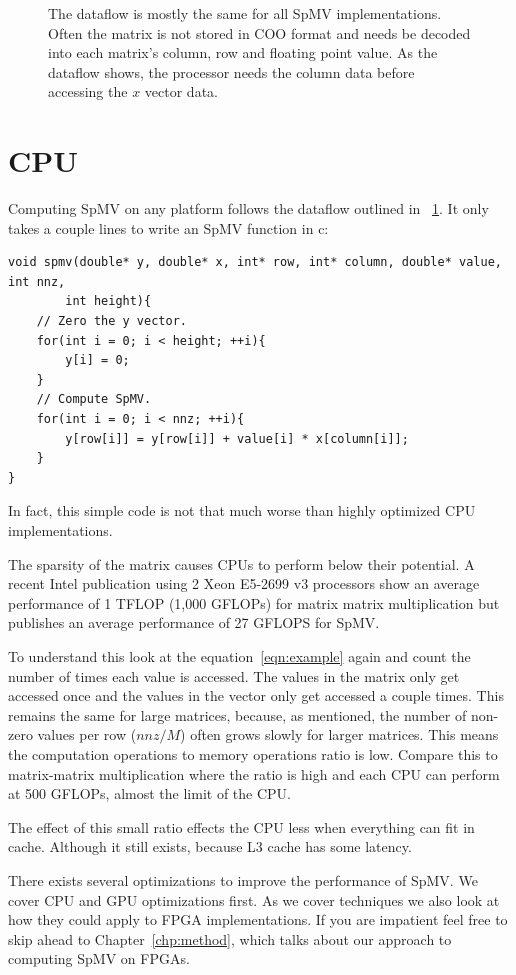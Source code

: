 \begin{figure}
\caption[SpMV dataflow diagram]{The dataflow is mostly the same for all SpMV implementations. Often the matrix is not stored in COO format and needs be decoded into each matrix's column, row and floating point value. As the dataflow shows, the processor needs the column data before accessing the $x$ vector data.}
\label{fig:dataflow}
\end{figure}%
\section{CPU}
Computing SpMV on any platform follows the dataflow outlined in \figurename~\ref{fig:dataflow}. It only takes a couple lines to write an SpMV function in c:
\begin{verbatim}
void spmv(double* y, double* x, int* row, int* column, double* value, int nnz,
        int height){
    // Zero the y vector.
    for(int i = 0; i < height; ++i){
        y[i] = 0;
    }
    // Compute SpMV.
    for(int i = 0; i < nnz; ++i){
        y[row[i]] = y[row[i]] + value[i] * x[column[i]];
    }
}
\end{verbatim}
In fact, this simple code is not that much worse than highly optimized CPU implementations.
\par The sparsity of the matrix causes CPUs to perform below their potential. A recent Intel publication using 2 Xeon E5-2699 v3 processors show an average performance of 1 TFLOP (1,000 GFLOPs) for matrix matrix multiplication but publishes an average performance of 27 GFLOPS for SpMV.
\par To understand this look at the equation~\ref{eqn:example} again and count the number of times each value is accessed. The values in the matrix only get accessed once and the values in the vector only get accessed a couple times. This remains the same for large matrices, because, as mentioned, the number of non-zero values per row ($nnz/M$) often grows slowly for larger matrices. This means the computation operations to memory operations ratio is low. Compare this to matrix-matrix multiplication where the ratio is high and each CPU can perform at 500 GFLOPs, almost the limit of the CPU.
\par The effect of this small ratio effects the CPU less when everything can fit in cache. Although it still exists, because L3 cache has some latency.
\par There exists several optimizations to improve the performance of SpMV. We cover CPU and GPU optimizations first. As we cover techniques we also look at how they could apply to FPGA implementations. If you are impatient feel free to skip ahead to Chapter~\ref{chp:method}, which talks about our approach to computing SpMV on FPGAs.

